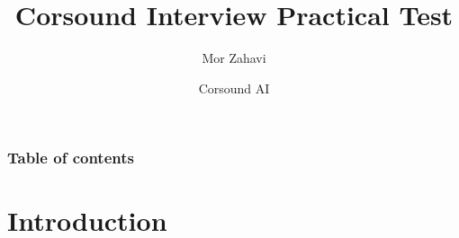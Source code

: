 \documentclass[hyperref={pdfpagelabels=false}, color=table]{beamer}
\title{Corsound Interview Practical Test}
\author{Mor Zahavi}
\date{Corsound AI}
\begin{document}
    \begin{frame}
        \titlepage
    \end{frame}
    \begin{frame}\frametitle{Table of contents}
    \tableofcontents
    \end{frame}
    \section{Introduction}
\end{document}
